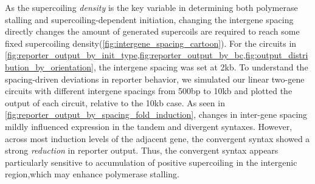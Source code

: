 \documentclass[11pt]{article}
\begin{document}
As the supercoiling \emph{density} is the key variable in determining both polymerase stalling and supercoiling-dependent initiation, changing the intergene spacing directly changes the amount of generated supercoils are required to reach some fixed supercoiling density(\cref{fig:intergene_spacing_cartoon}). For the circuits in \cref{fig:reporter_output_by_init_type,fig:reporter_output_by_bc,fig:output_distribution_by_orientation}, the intergene spacing was set at 2kb. To understand the spacing-driven deviations in reporter behavior, we simulated our linear two-gene circuits with different intergene spacings from 500bp to 10kb and plotted the output of each circuit, relative to the 10kb case. As seen in \cref{fig:reporter_output_by_spacing_fold_induction}, changes in inter-gene spacing mildly influenced expression in the tandem and divergent syntaxes. However, across most induction levels of the adjacent gene, the convergent syntax showed a strong \emph{reduction} in reporter output. Thus, the convergent syntax appears particularly sensitive to accumulation of positive supercoiling in the intergenic region,which may enhance polymerase stalling.
\end{document}
